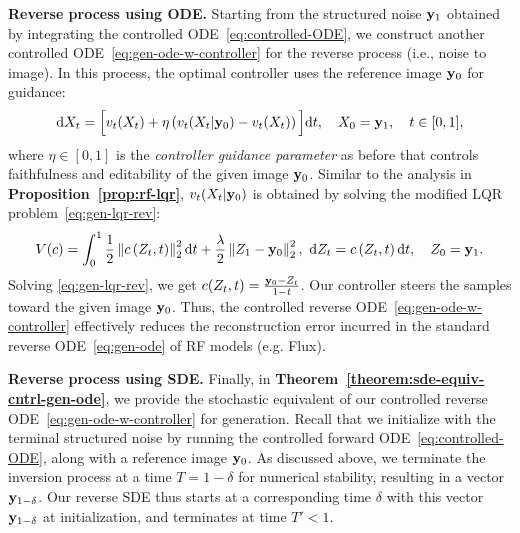 \documentclass{article} %
\theoremstyle{plain}
\newcommand{\deriv}{\mathrm{d}}
\begin{document}
\textbf{Reverse process using ODE.} Starting from the structured noise ${\mathbf{y}}_1$ obtained by integrating the controlled ODE~\eqref{eq:controlled-ODE}, we construct another controlled ODE~\eqref{eq:gen-ode-w-controller} for the reverse process (i.e., noise to image).
In this process, the optimal controller uses the reference image ${\mathbf{y}}_0$ for guidance:
\begin{align}
    \label{eq:gen-ode-w-controller}
    \deriv X_t = \Big[v_t(X_t) + \eta \left( v_t(X_t|\rvy_0) - v_t(X_t) \right)\Big] \deriv t, \quad X_0 = \rvy_1, \quad t\in [0,1],
\end{align}
where $\eta\!\in\![0,1]$ is the {\em controller guidance parameter} as before that controls faithfulness and editability of the given image ${\mathbf{y}}_0$.
Similar to the analysis in 
\textbf{Proposition~\ref{prop:rf-lqr}}, $v_t(X_t|{\mathbf{y}}_0)$ is obtained by solving the modified LQR problem~\eqref{eq:gen-lqr-rev}:
\begin{align}
    \label{eq:gen-lqr-rev}
    V(c) =  \int_0^1 \frac{1}{2}\left\|c\left(Z_t, t\right)\right\|_2^2 \deriv t + \frac{\lambda}{2} \left\|Z_1 - \rvy_0\right\|_2^2, ~\deriv Z_t = c\left(Z_t,t\right) \deriv t, \quad Z_0 =\rvy_1.
\end{align}
Solving \eqref{eq:gen-lqr-rev}, we get $c(Z_t,t) = \frac{{\mathbf{y}}_0 - Z_t}{1-t}$.
Our controller steers the samples toward the given image ${\mathbf{y}}_0$.
Thus, the controlled reverse ODE~\eqref{eq:gen-ode-w-controller} effectively reduces the reconstruction error incurred in the standard reverse ODE~\eqref{eq:gen-ode} of RF models (e.g. Flux).


\textbf{Reverse process using SDE.} Finally, in \textbf{Theorem~\ref{theorem:sde-equiv-cntrl-gen-ode}}, we provide the stochastic equivalent of our controlled reverse ODE~\eqref{eq:gen-ode-w-controller} for generation. Recall that we initialize with the terminal structured noise by running the controlled forward ODE~\eqref{eq:controlled-ODE}, along with a reference image ${\mathbf{y}}_0$. As discussed above, we terminate the inversion process at a time $T = 1 - \delta$ for numerical stability, resulting in a vector ${\mathbf{y}}_{1-\delta}$. Our reverse SDE thus starts at a corresponding time $\delta$ with this vector ${\mathbf{y}}_{1-\delta}$ at initialization, and terminates at time $T' < 1.$  
\end{document}
